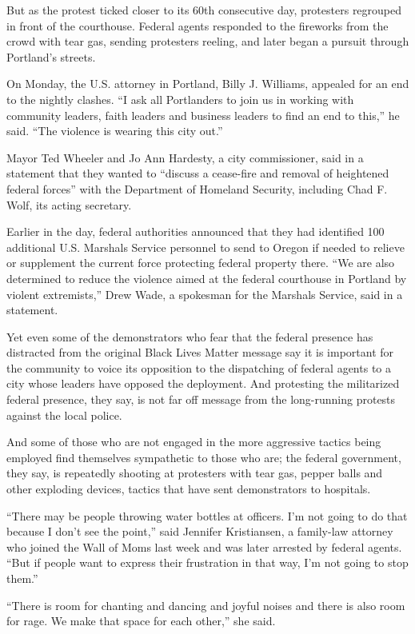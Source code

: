 But as the protest ticked closer to its 60th consecutive day, protesters
regrouped in front of the courthouse. Federal agents responded to the
fireworks from the crowd with tear gas, sending protesters reeling, and
later began a pursuit through Portland's streets.

On Monday, the U.S. attorney in Portland, Billy J. Williams, appealed
for an end to the nightly clashes. ``I ask all Portlanders to join us in
working with community leaders, faith leaders and business leaders to
find an end to this,'' he said. ``The violence is wearing this city
out.''

Mayor Ted Wheeler and Jo Ann Hardesty, a city commissioner, said in a
statement that they wanted to ``discuss a cease-fire and removal of
heightened federal forces'' with the Department of Homeland Security,
including Chad F. Wolf, its acting secretary.

Earlier in the day, federal authorities announced that they had
identified 100 additional U.S. Marshals Service personnel to send to
Oregon if needed to relieve or supplement the current force protecting
federal property there. ``We are also determined to reduce the violence
aimed at the federal courthouse in Portland by violent extremists,''
Drew Wade, a spokesman for the Marshals Service, said in a statement.

Yet even some of the demonstrators who fear that the federal presence
has distracted from the original Black Lives Matter message say it is
important for the community to voice its opposition to the dispatching
of federal agents to a city whose leaders have opposed the deployment.
And protesting the militarized federal presence, they say, is not far
off message from the long-running protests against the local police.

And some of those who are not engaged in the more aggressive tactics
being employed find themselves sympathetic to those who are; the federal
government, they say, is repeatedly shooting at protesters with tear
gas, pepper balls and other exploding devices, tactics that have sent
demonstrators to hospitals.

``There may be people throwing water bottles at officers. I'm not going
to do that because I don't see the point,'' said Jennifer Kristiansen, a
family-law attorney who joined the Wall of Moms last week and was later
arrested by federal agents. ``But if people want to express their
frustration in that way, I'm not going to stop them.''

``There is room for chanting and dancing and joyful noises and there is
also room for rage. We make that space for each other,'' she said.

